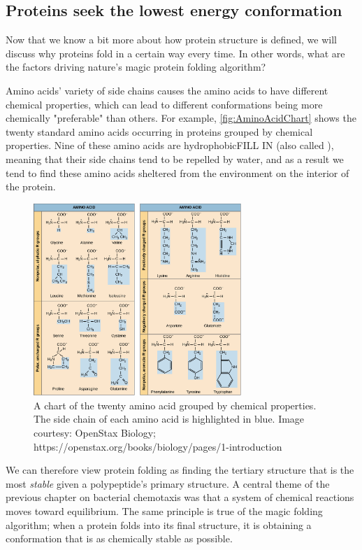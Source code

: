 {\FloatBarrier
{}
\subsection{Proteins seek the lowest energy conformation}

Now that we know a bit more about how protein structure is defined, we will discuss why proteins fold in a certain way every time. In other words, what are the factors driving nature's magic protein folding algorithm?

Amino acids' variety of side chains causes the amino acids to have different chemical properties, which can lead to different conformations being more chemically "preferable" than others. For example, \autoref{fig:AminoAcidChart} shows the twenty standard amino acids occurring in proteins grouped by chemical properties. Nine of these amino acids are hydrophobic{}{FILL IN} (also called ), meaning that their side chains tend to be repelled by water, and as a result we tend to find these amino acids sheltered from the environment on the interior of the protein.

\begin{figure}[h]
	\centering
	\mySfFamily
	\includegraphics[width = 0.7\textwidth]{../images/AminoAcidChart.png}
	\caption{A chart of the twenty amino acid grouped by chemical properties. The side chain of each amino acid is highlighted in blue. Image courtesy: OpenStax Biology; https://openstax.org/books/biology/pages/1-introduction}
	\label{fig:AminoAcidChart}
\end{figure}

We can therefore view protein folding as finding the tertiary structure that is the most \textit{stable} given a polypeptide's primary structure. A central theme of the previous chapter on bacterial chemotaxis was that a system of chemical reactions moves toward equilibrium. The same principle is true of the magic folding algorithm; when a protein folds into its final structure, it is obtaining a conformation that is as chemically stable as possible.

}
